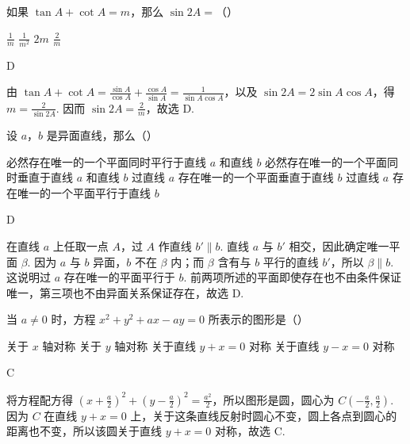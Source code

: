 \begin{problem}
如果 \(\tan A + \cot A = m\)，那么 \(\sin 2A =\)（\quad）

\choices
    {\(\frac{1}{m}\)}
    {\(\frac{1}{m^2}\)}
    {\(2m\)}
    {\(\frac{2}{m}\)}
\end{problem}

\begin{answer}
D
\end{answer}

\begin{solution}
由 \(\tan A+\cot A=\frac{\sin A}{\cos A}+\frac{\cos A}{\sin A}=\frac{1}{\sin A\cos A}\)，以及 \(\sin2A=2\sin A\cos A\)，得 \(m=\frac{2}{\sin2A}\). 因而 \(\sin2A=\frac{2}{m}\)，故选 D.
\end{solution}

\begin{problem}
设 \(a\)，\(b\) 是异面直线，那么（\quad）

\choices
    {必然存在唯一的一个平面同时平行于直线 \(a\) 和直线 \(b\)}
    {必然存在唯一的一个平面同时垂直于直线 \(a\) 和直线 \(b\)}
    {过直线 \(a\) 存在唯一的一个平面垂直于直线 \(b\)}
    {过直线 \(a\) 存在唯一的一个平面平行于直线 \(b\)}
\end{problem}

\begin{answer}
D
\end{answer}

\begin{solution}
在直线 \(a\) 上任取一点 \(A\)，过 \(A\) 作直线 \(b'\parallel b\). 直线 \(a\) 与 \(b'\) 相交，因此确定唯一平面 \(\beta\). 因为 \(a\) 与 \(b\) 异面，\(b\) 不在 \(\beta\) 内；而 \(\beta\) 含有与 \(b\) 平行的直线 \(b'\)，所以 \(\beta\parallel b\). 这说明过 \(a\) 存在唯一的平面平行于 \(b\). 前两项所述的平面即使存在也不由条件保证唯一，第三项也不由异面关系保证存在，故选 D.
\end{solution}

\begin{problem}
当 \(a \neq 0\) 时，方程 \(x^2 + y^2 + ax - ay = 0\) 所表示的图形是（\quad）

\choices
    {关于 \(x\) 轴对称}
    {关于 \(y\) 轴对称}
    {关于直线 \(y + x = 0\) 对称}
    {关于直线 \(y - x = 0\) 对称}
\end{problem}

\begin{answer}
C
\end{answer}

\begin{solution}
将方程配方得 \(\left(x+\frac a2\right)^2+\left(y-\frac a2\right)^2=\frac{a^2}{2}\)，所以图形是圆，圆心为 \(C\left(-\frac a2,\frac a2\right)\). 因为 \(C\) 在直线 \(y+x=0\) 上，关于这条直线反射时圆心不变，圆上各点到圆心的距离也不变，所以该圆关于直线 \(y+x=0\) 对称，故选 C.
\end{solution}

